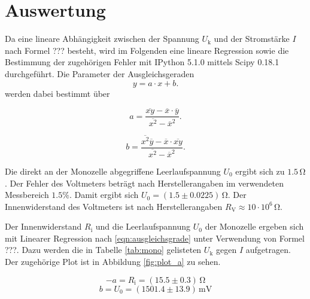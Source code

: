 \section{Auswertung}
\label{sec:Auswertung}
Da eine lineare Abhängigkeit zwischen der Spannung $U_\text{k}$ und der Stromstärke $I$ nach Formel ??? besteht,
wird im Folgenden eine lineare Regression sowie die Bestimmung der zugehörigen Fehler mit
IPython 5.1.0 mittels Scipy 0.18.1 durchgeführt.
Die Parameter der Ausgleichsgeraden
\begin{equation}
\label{eqn:ausgleichsgrade}
y=a \cdot x +b .
\end{equation}
werden dabei bestimmt über

\begin{equation*}
\label{eqn:ausgleichsgrade_a}
a= \frac{ \overline{xy}- \overline{x} \cdot \overline{y}}{\overline{x^2}-\overline{x}^2} .
\end{equation*}

\begin{equation*}
\label{eqn:ausgleichsgrade_b}
b= \frac{ \overline{x^2} \overline{y}- \overline{x} \cdot \overline{xy}}{\overline{x^2}-\overline{x}^2} .
\end{equation*}

Die direkt an der Monozelle abgegriffene Leerlaufspannung $U_\text{0}$ ergibt sich zu $1.5 \,\si{\ohm}$.
Der Fehler des Voltmeters beträgt nach Herstellerangaben im verwendeten Messbereich $1.5\%$.
Damit ergibt sich $U_\text{0}=(1.5 \pm 0.0225) \,\si{\ohm}$.
Der Innenwiderstand des Voltmeters ist nach Herstellerangaben $R_\text{V}\approx 10 \cdot 10^6 \,\si{\ohm}$.

Der Innenwiderstand $R_\text{i}$ und die Leerlaufspannung $U_\text{0}$ der Monozelle ergeben sich mit
Linearer Regression nach \eqref{eqn:ausgleichsgrade} unter Verwendung von Formel ???.
Dazu werden die in Tabelle \ref{tab:mono} gelisteten $U_\text{k}$ gegen $I$ aufgetragen. Der zugehörige Plot ist in Abbildung \ref{fig:plot_a} zu sehen.

\begin{equation*}
  -a= R_\text{i}=(15.5\pm0.3)\,\si{\ohm}
\end{equation*}
\begin{equation*}
  b =U_\text{0}=(1501.4\pm13.9)\,\si{\milli\volt}
\end{equation*}


